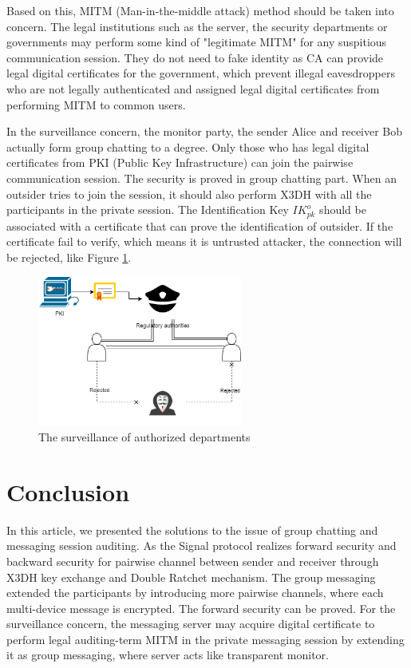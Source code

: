 \documentclass[11pt,en]{elegantpaper}
\begin{document}
Based on this, MITM (Man-in-the-middle attack) method should be taken into concern. The legal institutions such as the server, the security departments or governments may perform some kind of "legitimate MITM" for any suspitious communication session. They do not need to fake identity as CA can provide legal digital certificates for the government, which prevent illegal eavesdroppers who are not legally authenticated and assigned legal digital certificates from performing MITM to common users.

In the surveillance concern, the monitor party, the sender Alice and receiver Bob actually form group chatting to a degree. Only those who has legal digital certificates from PKI (Public Key Infrastructure) can join the pairwise communication session. The security is proved in group chatting part. When an outsider tries to join the session, it should also perform X3DH with all the participants in the private session. The Identification Key $IK_{pk}^o$ should be associated with a certificate that can prove the identification of outsider. If the certificate fail to verify, which means it is untrusted attacker, the connection will be rejected, like Figure \ref{suv}.

\begin{figure}[H]
    \centering
    \includegraphics[width=0.6\textwidth]{image/suv}
    \caption{The surveillance of authorized departments}
    \label{suv}
\end{figure}


\section{Conclusion}
In this article, we presented the solutions to the issue of group chatting and messaging session auditing. As the Signal protocol realizes forward security and backward security for pairwise channel between sender and receiver through X3DH key exchange and Double Ratchet mechanism. The group messaging extended the participants by introducing more pairwise channels, where each multi-device message is encrypted. The forward security can be proved. For the surveillance concern, the messaging server may acquire digital certificate to perform legal auditing-term MITM in the private messaging session by extending it as group messaging, where server acts like transparent monitor.


\end{document}
